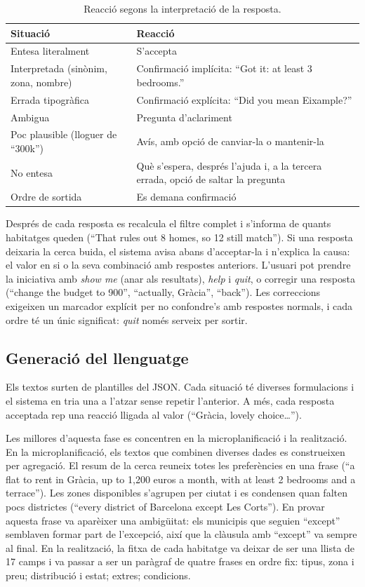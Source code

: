 \documentclass[10pt,a4paper]{article}
\begin{document}
\begin{table}[ht]
\centering\small
\caption{Reacció segons la interpretació de la resposta.}
\label{tab:reaccions}
\begin{tabularx}{\textwidth}{@{}>{\raggedright\arraybackslash}p{5.2cm}L@{}}
\toprule
Situació & Reacció \\
\midrule
Entesa literalment & S'accepta \\
Interpretada (sinònim, zona, nombre) & Confirmació implícita: ``Got it: at least 3 bedrooms.'' \\
Errada tipogràfica & Confirmació explícita: ``Did you mean Eixample?'' \\
Ambigua & Pregunta d'aclariment \\
Poc plausible (lloguer de ``300k'') & Avís, amb opció de canviar-la o mantenir-la \\
No entesa & Què s'espera, després l'ajuda i, a la tercera errada, opció de saltar la pregunta \\
Ordre de sortida & Es demana confirmació \\
\bottomrule
\end{tabularx}
\end{table}

Després de cada resposta es recalcula el filtre complet i s'informa de quants habitatges queden (``That rules out 8 homes, so 12 still match''). Si una resposta deixaria la cerca buida, el sistema avisa abans d'acceptar-la i n'explica la causa: el valor en si o la seva combinació amb respostes anteriors. L'usuari pot prendre la iniciativa amb \emph{show me} (anar als resultats), \emph{help} i \emph{quit}, o corregir una resposta (``change the budget to 900'', ``actually, Gràcia'', ``back''). Les correccions exigeixen un marcador explícit per no confondre's amb respostes normals, i cada ordre té un únic significat: \emph{quit} només serveix per sortir.

\subsection{Generació del llenguatge}

Els textos surten de plantilles del JSON. Cada situació té diverses formulacions i el sistema en tria una a l'atzar sense repetir l'anterior. A més, cada resposta acceptada rep una reacció lligada al valor (``Gràcia, lovely choice\ldots'').

Les millores d'aquesta fase es concentren en la microplanificació i la realització. En la microplanificació, els textos que combinen diverses dades es construeixen per agregació. El resum de la cerca reuneix totes les preferències en una frase (``a flat to rent in Gràcia, up to 1,200 euros a month, with at least 2 bedrooms and a terrace''). Les zones disponibles s'agrupen per ciutat i es condensen quan falten pocs districtes (``every district of Barcelona except Les Corts''). En provar aquesta frase va aparèixer una ambigüitat: els municipis que seguien ``except'' semblaven formar part de l'excepció, així que la clàusula amb ``except'' va sempre al final. En la realització, la fitxa de cada habitatge va deixar de ser una llista de 17 camps i va passar a ser un paràgraf de quatre frases en ordre fix: tipus, zona i preu; distribució i estat; extres; condicions.
\end{document}
